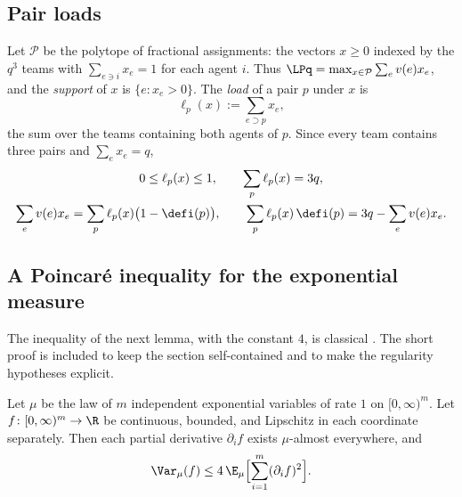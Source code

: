 \subsection{Pair loads}
Let $\mathcal P$ be the polytope of fractional assignments: the vectors $x\ge0$ indexed by
the $q^3$ teams with $\sum_{e\ni i}x_e=1$ for each agent $i$. Thus
$\LPq=\max_{x\in\mathcal P}\sum_ev(e)x_e$, and the \emph{support} of $x$ is
$\{e:x_e>0\}$. The \emph{load} of a pair $p$ under $x$ is
\[
\ell_p(x):=\sum_{e\supset p}x_e ,
\]
the sum over the teams containing both agents of $p$. Since every team contains three
pairs and $\sum_ex_e=q$,
\begin{equation}\label{eq:variance-loads}
\begin{gathered}
0\le\ell_p(x)\le1,\qquad \sum_p\ell_p(x)=3q,\\
\sum_ev(e)x_e=\sum_p\ell_p(x)\bigl(1-\defi(p)\bigr),\qquad
\sum_p\ell_p(x)\,\defi(p)=3q-\sum_ev(e)x_e .
\end{gathered}
\end{equation}

\subsection{A Poincar\'e inequality for the exponential measure}\label{sec:variance-poincare}

The inequality of the next lemma, with the constant $4$, is classical
\cite{BobkovLedoux97}. The short proof is included to keep the section self-contained and
to make the regularity hypotheses explicit.

\begin{lemma}\label{lem:variance-poincare}
Let $\mu$ be the law of $m$ independent exponential variables of rate $1$ on
$[0,\infty)^m$. Let $f\colon[0,\infty)^m\to\R$ be continuous, bounded, and Lipschitz in each
coordinate separately. Then each partial derivative $\partial_if$ exists $\mu$-almost
everywhere, and
\[
\Var_\mu(f)\le4\,\E_\mu\Bigl[\sum_{i=1}^m(\partial_if)^2\Bigr].
\]
\end{lemma}

